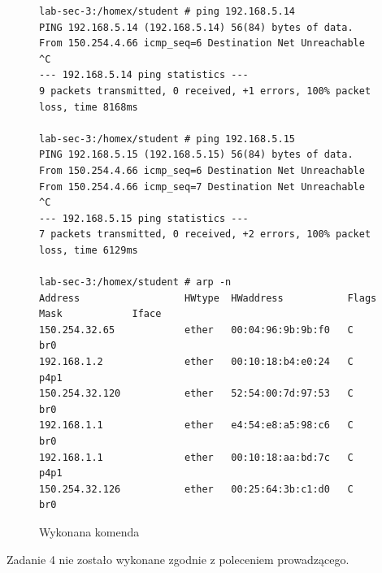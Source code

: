 \documentclass[polish, a4paper]{article}
\begin{document}
\begin{figure}[H]
\begin{verbatim}
lab-sec-3:/homex/student # ping 192.168.5.14
PING 192.168.5.14 (192.168.5.14) 56(84) bytes of data.
From 150.254.4.66 icmp_seq=6 Destination Net Unreachable
^C
--- 192.168.5.14 ping statistics ---
9 packets transmitted, 0 received, +1 errors, 100% packet loss, time 8168ms

lab-sec-3:/homex/student # ping 192.168.5.15
PING 192.168.5.15 (192.168.5.15) 56(84) bytes of data.
From 150.254.4.66 icmp_seq=6 Destination Net Unreachable
From 150.254.4.66 icmp_seq=7 Destination Net Unreachable
^C
--- 192.168.5.15 ping statistics ---
7 packets transmitted, 0 received, +2 errors, 100% packet loss, time 6129ms

lab-sec-3:/homex/student # arp -n
Address                  HWtype  HWaddress           Flags Mask            Iface
150.254.32.65            ether   00:04:96:9b:9b:f0   C                     br0
192.168.1.2              ether   00:10:18:b4:e0:24   C                     p4p1
150.254.32.120           ether   52:54:00:7d:97:53   C                     br0
192.168.1.1              ether   e4:54:e8:a5:98:c6   C                     br0
192.168.1.1              ether   00:10:18:aa:bd:7c   C                     p4p1
150.254.32.126           ether   00:25:64:3b:c1:d0   C                     br0
\end{verbatim}
\caption{Wykonana komenda}
\end{figure}

Zadanie 4 nie zostało wykonane zgodnie z poleceniem prowadzącego.
\end{document}
